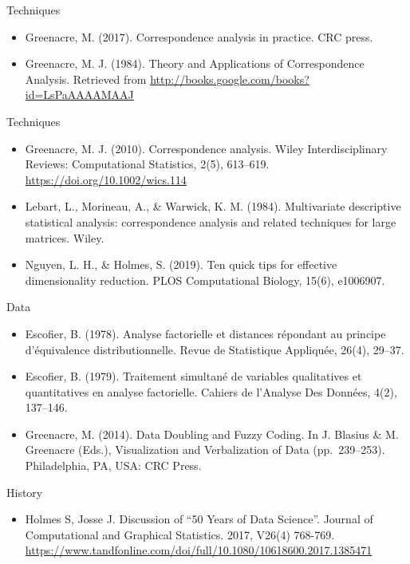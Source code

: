 \documentclass[
  ignorenonframetext,
]{beamer}
\providecommand{\tightlist}{%
  \setlength{\itemsep}{0pt}\setlength{\parskip}{0pt}}
\begin{document}
\begin{frame}{Techniques}
\protect\hypertarget{techniques}{}

\begin{itemize}[<+->]
\item
  Greenacre, M. (2017). Correspondence analysis in practice. CRC press.
\item
  Greenacre, M. J. (1984). Theory and Applications of Correspondence
  Analysis. Retrieved from
  \url{http://books.google.com/books?id=LsPaAAAAMAAJ}
\end{itemize}

\end{frame}

\begin{frame}{Techniques}
\protect\hypertarget{techniques-1}{}

\begin{itemize}[<+->]
\item
  Greenacre, M. J. (2010). Correspondence analysis. Wiley
  Interdisciplinary Reviews: Computational Statistics, 2(5), 613--619.
  \url{https://doi.org/10.1002/wics.114}
\item
  Lebart, L., Morineau, A., \& Warwick, K. M. (1984). Multivariate
  descriptive statistical analysis: correspondence analysis and related
  techniques for large matrices. Wiley.
\item
  Nguyen, L. H., \& Holmes, S. (2019). Ten quick tips for effective
  dimensionality reduction. PLOS Computational Biology, 15(6), e1006907.
\end{itemize}

\end{frame}

\begin{frame}{Data}
\protect\hypertarget{data}{}

\begin{itemize}[<+->]
\item
  Escofier, B. (1978). Analyse factorielle et distances répondant au
  principe d'équivalence distributionnelle. Revue de Statistique
  Appliquée, 26(4), 29--37.
\item
  Escofier, B. (1979). Traitement simultané de variables qualitatives et
  quantitatives en analyse factorielle. Cahiers de l'Analyse Des
  Données, 4(2), 137--146.
\item
  Greenacre, M. (2014). Data Doubling and Fuzzy Coding. In J. Blasius \&
  M. Greenacre (Eds.), Visualization and Verbalization of Data
  (pp.~239--253). Philadelphia, PA, USA: CRC Press.
\end{itemize}

\end{frame}

\begin{frame}{History}
\protect\hypertarget{history-1}{}

\begin{itemize}[<+->]
\tightlist
\item
  Holmes S, Josse J. Discussion of ``50 Years of Data Science''. Journal
  of Computational and Graphical Statistics. 2017, V26(4) 768-769.
  \url{https://www.tandfonline.com/doi/full/10.1080/10618600.2017.1385471}
\end{itemize}

\end{frame}
\end{document}
